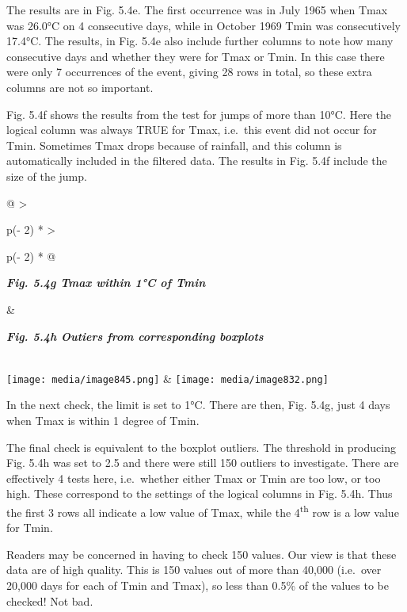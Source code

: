\documentclass[
  letterpaper,
  DIV=11,
  numbers=noendperiod]{scrreprt}
\begin{document}
The results are in Fig. 5.4e. The first occurrence was in July 1965 when
Tmax was 26.0°C on 4 consecutive days, while in October 1969 Tmin was
consecutively 17.4°C. The results, in Fig. 5.4e also include further
columns to note how many consecutive days and whether they were for Tmax
or Tmin. In this case there were only 7 occurrences of the event, giving
28 rows in total, so these extra columns are not so important.

Fig. 5.4f shows the results from the test for jumps of more than 10°C.
Here the logical column was always TRUE for Tmax, i.e.~this event did
not occur for Tmin. Sometimes Tmax drops because of rainfall, and this
column is automatically included in the filtered data. The results in
Fig. 5.4f include the size of the jump.

\begin{longtable}[]{@{}
  >{\raggedright\arraybackslash}p{(\columnwidth - 2\tabcolsep) * }
  >{\raggedright\arraybackslash}p{(\columnwidth - 2\tabcolsep) * }@{}}
\toprule\noalign{}
\begin{minipage}[b]{\linewidth}\raggedright
\textbf{\emph{Fig. 5.4g Tmax within 1°C of Tmin}}
\end{minipage} & \begin{minipage}[b]{\linewidth}\raggedright
\textbf{\emph{Fig. 5.4h Outiers from corresponding boxplots}}
\end{minipage} \\
\midrule\noalign{}
\endhead
\bottomrule\noalign{}
\endlastfoot
\texttt{[image: media/image845.png]} &
\texttt{[image: media/image832.png]} \\
\end{longtable}

In the next check, the limit is set to 1°C. There are then, Fig. 5.4g,
just 4 days when Tmax is within 1 degree of Tmin.

The final check is equivalent to the boxplot outliers. The threshold in
producing Fig. 5.4h was set to 2.5 and there were still 150 outliers to
investigate. There are effectively 4 tests here, i.e.~whether either
Tmax or Tmin are too low, or too high. These correspond to the settings
of the logical columns in Fig. 5.4h. Thus the first 3 rows all indicate
a low value of Tmax, while the 4\textsuperscript{th} row is a low value
for Tmin.

Readers may be concerned in having to check 150 values. Our view is that
these data are of high quality. This is 150 values out of more than
40,000 (i.e.~over 20,000 days for each of Tmin and Tmax), so less than
0.5\% of the values to be checked! Not bad.
\end{document}
